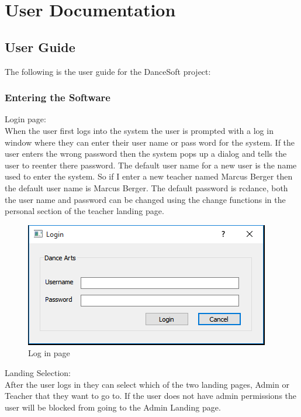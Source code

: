 

\chapter{User Documentation}

\section{User Guide}

The following is the user guide for the DanceSoft project:

\subsection{Entering the Software}
Login page:\\
When the user first logs into the system the user is prompted with a log in window where they can enter their user name or pass word for the system. If the user enters the wrong password then the system pops up a dialog and tells the user to reenter there password. The default user name for a new user is the name used to enter the system. So if I enter a new teacher named Marcus Berger then the default user name is Marcus Berger. The default password is rcdance, both the user name and password can be changed using the change functions in the personal section of the teacher landing page.\\

\begin{figure}
  \includegraphics[width=\linewidth]{pics/userGuide/login.png}
  \caption{Log in page}
  \label{fig:User doc: log in}
\end{figure}

Landing Selection:\\
After the user logs in they can select which of the two landing pages, Admin or Teacher that they want to go to. If the user does not have admin permissions the user will be blocked from going to the Admin Landing page.\\

